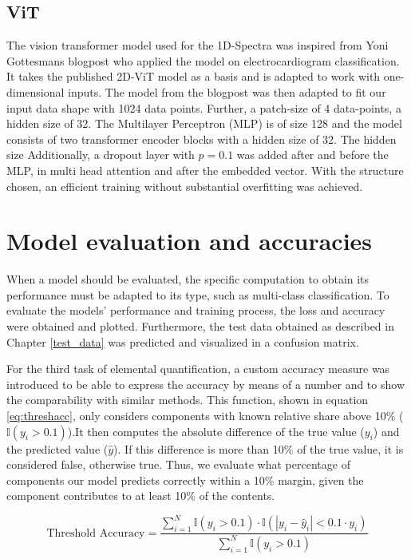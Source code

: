 \subsection{ViT}
The vision transformer model used for the 1D-Spectra was inspired from Yoni Gottesmans blogpost \cite{noauthor_interpretable_2023} who applied the model on electrocardiogram classification. 
It takes the published 2D-ViT model \cite{dosovitskiy_image_2021}as a basis and is adapted to work with one-dimensional inputs.
The model from the blogpost was then adapted to fit our input data shape with 1024 data points. Further, a patch-size of 4 data-points, a hidden size of 32. The Multilayer Perceptron (MLP) is of size 128 and the model consists of two transformer encoder blocks with a hidden size of 32. The hidden size  Additionally, a dropout layer with $p=0.1$ was added after and before the MLP, 
in multi head attention and after the embedded vector.
With the structure chosen, an efficient training without substantial overfitting was achieved. 



\section{Model evaluation and accuracies}

When a model should be evaluated, the specific computation to obtain its performance must be adapted to its type, such as multi-class classification. 
To evaluate the models' performance and training process, the loss and accuracy were obtained and plotted. Furthermore, the test data obtained as described in Chapter \ref{test_data} was predicted and visualized in a confusion matrix.

For the third task of elemental quantification, a custom accuracy measure was introduced to be able to express the accuracy by means of a number and to show the comparability with similar methods. This function, shown in equation \ref{eq:threshacc}, only considers components with known relative share above 10\% ($\mathbb{I}(y_i > 0.1)$).It then computes the absolute difference of the true value ($y_{i}$) and the predicted value ($\hat{y}$). If this difference is more than 10\% of the true value, it is considered false, otherwise true. Thus, we evaluate what percentage of components our model predicts correctly within a 10\% margin, given the component contributes to at least 10\% of the contents.

\begin{equation}
\label{eq:threshacc}
\text{Threshold Accuracy} = \frac{\sum_{i=1}^{N} \mathbb{I}(y_i > 0.1) \cdot \mathbb{I}(|y_i - \hat{y}_i| < 0.1 \cdot y_i)}{\sum_{i=1}^{N} \mathbb{I}(y_i > 0.1)}
\end{equation}

